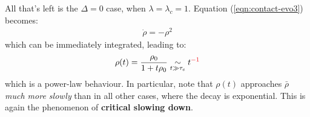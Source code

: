 \documentclass[../../main.tex]{subfiles}
\begin{document}
All that's left is the $\Delta = 0$ case, when $\lambda = \lambda_c = 1$. Equation (\ref{eqn:contact-evo3}) becomes:
\begin{align*}
    \dot{\rho} = - \rho^2
\end{align*}
which can be immediately integrated, leading to:
\begin{align*}
    \rho(t) = \frac{\rho_0}{1 + t \rho_0} \underset{t \gg \tau_c}{\sim}  t^{\textcolor{Red}{-1}} 
\end{align*}
which is a power-law behaviour. In particular, note that $\rho(t)$ approaches $\bar{\rho}$ \textit{much more slowly} than in all other cases, where the decay is exponential. This is again the phenomenon of \textbf{critical slowing down}. 
\end{document}
